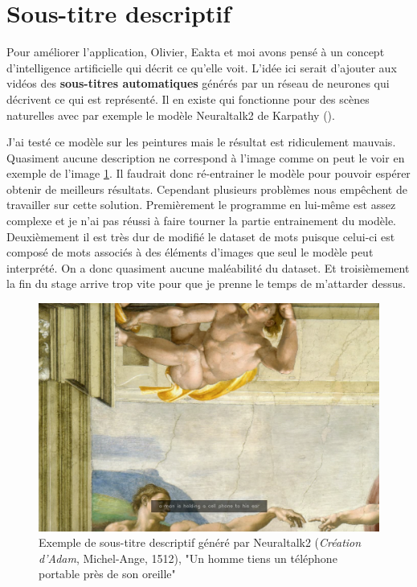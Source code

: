 \section{Sous-titre descriptif}

\par
Pour améliorer l'application, Olivier, Eakta et moi avons pensé à un concept d'intelligence artificielle qui décrit ce qu'elle voit. L'idée ici serait d'ajouter aux vidéos des \textbf{sous-titres automatiques} générés par un réseau de neurones qui décrivent ce qui est représenté. Il en existe qui fonctionne pour des scènes naturelles avec par exemple le modèle Neuraltalk2 de Karpathy \cite{neuraltalk2} ().

\par
J'ai testé ce modèle sur les peintures mais le résultat est ridiculement mauvais. Quasiment aucune description ne correspond à l'image comme on peut le voir en exemple de l'image \ref{fig:ex_neuraltalk}. Il faudrait donc ré-entrainer le modèle pour pouvoir espérer obtenir de meilleurs résultats. Cependant plusieurs problèmes nous empêchent de travailler sur cette solution. Premièrement le programme en lui-même est assez complexe et je n'ai pas réussi à faire tourner la partie entrainement du modèle. Deuxièmement il est très dur de modifié le dataset de mots puisque celui-ci est composé de mots associés à des éléments d'images que seul le modèle peut interprété. On a donc quasiment aucune maléabilité du dataset. Et troisièmement la fin du stage arrive trop vite pour que je prenne le temps de m'attarder dessus.

\begin{figure}[ht]
  \centering
  \includegraphics[width=0.7\linewidth]{datas/exemple_sous_titre.png}
  \caption{Exemple de sous-titre descriptif généré par Neuraltalk2 (\emph{Création d'Adam}, Michel-Ange, 1512), "Un homme tiens un téléphone portable près de son oreille"}
  \label{fig:ex_neuraltalk}
\end{figure}

